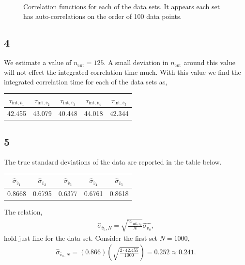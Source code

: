 \documentclass[singlepage,notitlepage,nofootinbib,11pt]{revtex4-1}
\newcommand{\eq}[1]{\begin{align*}#1\end{align*}}
\def\l{\left}
\def\r{\right}
\begin{document}
\begin{figure}[h]
\hfill
  \caption{\label{corrs} Correlation functions for each of the data sets. It appears each set has auto-correlations on the order of 100 data points.}
\end{figure}
\clearpage
\subsection{4}
We estimate a value of $n_{\text{cut}}=125$. A small deviation in $n_{\text{cut}}$ around this value will not effect the integrated correlation time much. With this value we find the integrated correlation time for each of the data sets as,
\begin{center}
\begin{tabular}{ | c | c | c | c | c |}\hline
  $\tau_{\text{int},\overline{v}_1}$ &  $\tau_{\text{int},\overline{v}_2}$ &  $\tau_{\text{int},\overline{v}_3}$ &  $\tau_{\text{int},\overline{v}_4}$ &  $\tau_{\text{int},\overline{v}_5}$  \\ \hline \hline 
  42.455 & 43.079 & 40.448 & 44.018 & 42.344 \\ \hline
\end{tabular}
\end{center}
\subsection{5}
The true standard deviations of the data are reported in the table below.
\begin{center}
\begin{tabular}{ | c | c | c | c | c |}\hline
  $\hat{\sigma}_{\overline{v}_1}$ &  $\hat{\sigma}_{\overline{v}_2}$ &  $\hat{\sigma}_{\overline{v}_3}$ &  $\hat{\sigma}_{\overline{v}_4}$ &  $\hat{\sigma}_{\overline{v}_5}$  \\ \hline \hline 
  0.8668 & 0.6795 & 0.6377 & 0.6761 & 0.8618 \\ \hline
\end{tabular}
\end{center}
The relation,
\eq{
\hat{\sigma}_{\overline{v}_a,N}=\sqrt{\frac{2\hat{\tau}_{\text{int},\overline{v}_a}}{N}}\hat{\sigma_{v_a}},
}
hold just fine for the data set. Consider the first set $N=1000$,
\eq{
\hat{\sigma}_{\overline{v}_a,N} = (0.866)\l(\sqrt{\frac{2\cdot42.455}{1000}}\r) =  0.252 \approx 0.241.
}
\end{document}
